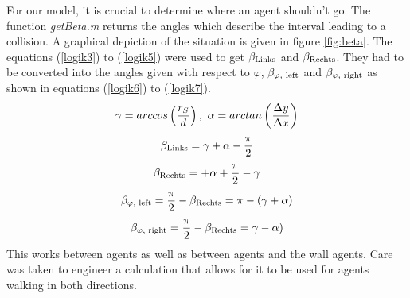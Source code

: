 \noi For our model, it is crucial to determine where an agent shouldn't go. The function \textit{getBeta.m} returns the angles which describe the interval leading to a collision. A graphical depiction of the situation is given in figure \ref{fig:beta}. The equations (\ref{logik3}) to (\ref{logik5}) were used to get $\beta_{\text{Links}}$ and $\beta_{\text{Rechts}}$. They had to be converted into the angles given with respect to $\varphi$, $\beta_{\varphi,\text{ left}}$ and $\beta_{\varphi,\text{ right}}$ as shown in equations (\ref{logik6}) to (\ref{logik7}).
\begin{equation}\label{logik3}
	\gamma = arccos\displaystyle \left(\frac{r_S}{d}\right),\ \alpha = arctan\displaystyle \left(\frac{\Delta y}{\Delta x}\right)
\end{equation}
\begin{equation}\label{logik4}
	\beta_{\text{Links}} = \gamma + \alpha - \frac{\pi}{2}
\end{equation}
\begin{equation}\label{logik5}
	\beta_{\text{Rechts}} = + \alpha + \frac{\pi}{2} - \gamma
\end{equation}
\begin{equation}\label{logik6}
  \beta_{\varphi,\text{ left}} = \frac{\pi}{2} - \beta_{\text{Rechts}} = \pi - (\gamma + \alpha)
\end{equation}
\begin{equation}\label{logik7}
  \beta_{\varphi,\text{ right}} = \frac{\pi}{2} - \beta_{\text{Rechts}} = \gamma - \alpha)
\end{equation}
\noi This works between agents as well as between agents and the wall agents. Care was taken to engineer a calculation that allows for it to be used for agents walking in both directions.

